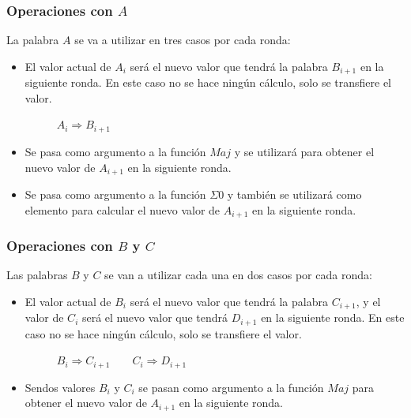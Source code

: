 \documentclass{article}
\begin{document}
        \subsubsection{Operaciones con $A$}
            La palabra $A$ se va a utilizar en tres casos por cada ronda:
            \begin{itemize}
                \item El valor actual de $A_{i}$ será el nuevo valor que tendrá la palabra $B_{i+1}$ en la siguiente ronda. En este caso no se hace ningún cálculo, solo se transfiere el valor.
                \begin{figure}[H]
                \centering
                    $A_{i} \Rightarrow B_{i+1}$
                \end{figure}
                \item Se pasa como argumento a la función $Maj$ y se utilizará para obtener el nuevo valor de $A_{i+1}$ en la siguiente ronda.
                \item Se pasa como argumento a la función $\Sigma0$ y también se utilizará como elemento para calcular el nuevo valor de $A_{i+1}$ en la siguiente ronda.
            \end{itemize}
        
        \subsubsection{Operaciones con $B$ y $C$}
            Las palabras $B$ y $C$ se van a utilizar cada una en dos casos por cada ronda:
            \begin{itemize}
                \item El valor actual de $B_{i}$ será el nuevo valor que tendrá la palabra $C_{i+1}$, y el valor de $C_{i}$ será el nuevo valor que tendrá $D_{i+1}$ en la siguiente ronda. En este caso no se hace ningún cálculo, solo se transfiere el valor.
                \begin{figure}[H]
                \centering
                    $B_{i} \Rightarrow C_{i+1} \qquad C_{i} \Rightarrow D_{i+1}$
                \end{figure}
                \item Sendos valores $B_{i}$ y $C_{i}$ se pasan como argumento a la función $Maj$ para obtener el nuevo valor de $A_{i+1}$ en la siguiente ronda.
            \end{itemize}
        
\end{document}
